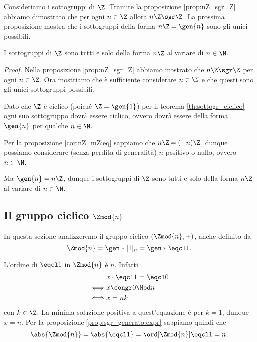 Consideriamo i sottogruppi di $\Z$. Tramite la proposizione \ref{prop:nZ_sgr_Z} abbiamo dimostrato che per ogni $n \in \Z$ allora $n\Z \sgr \Z$. La prossima proposizione mostra che i sottogruppi della forma $n\Z = \gen{n}$ sono gli unici possibili.

\begin{proposition}
    \label{prop:sgr_Z}
    I sottogruppi di $\Z$ sono tutti e solo della forma $n\Z$ al variare di $n \in \N$.
\end{proposition}
\begin{proof}
    Nella proposizione \ref{prop:nZ_sgr_Z} abbiamo mostrato che $n\Z \sgr \Z$ per ogni $n \in \Z$. Ora mostriamo che è sufficiente considerare $n \in \N$ e che questi sono gli unici sottogruppi possibili.

    Dato che $\Z$ è ciclico (poiché $\Z = \gen{1}$) per il teorema \ref{th:sottogr_ciclico} ogni suo sottogruppo dovrà essere ciclico, ovvero dovrà essere della forma $\gen{n}$ per qualche $n \in \N$.

    Per la proposizione \ref{cor:nZ_mZ:eq} sappiamo che $n\Z = (-n)\Z$, dunque possiamo considerare (senza perdita di generalità) $n$ positivo o nullo, ovvero $n \in \N$.

    Ma $\gen{n} = n\Z$, dunque i sottogruppi di $\Z$ sono tutti e solo della forma $n\Z$ al variare di $n \in \N$.
\end{proof}


\subsection{Il gruppo ciclico $\Zmod{n}$}

In questa sezione analizzeremo il gruppo ciclico $(\Zmod{n}, +)$, anche definito da \[
    \Zmod{n} = \gen*{[1]_n} = \gen*{\eqcl 1}.
\]

L'ordine di $\eqcl 1$ in $\Zmod{n}$ è $n$. Infatti \begin{align*}
    &x\cdot \eqcl 1 = \eqcl 0\\
    \iff &x \congr 0 \Mod n \\
    \iff &x = nk
\end{align*}
con $k \in \Z$. 
La minima soluzione positiva a quest'equazione è per $k = 1$, dunque $x = n$. 
Per la proposizione \ref{prop:sgr_generato:expr} sappiamo quindi che \begin{equation} \label{eq:card_Z/nZ}
    \abs{\Zmod{n}} = \abs{\eqcl 1} = \ord[\Zmod{n}]{\eqcl 1} = n.
\end{equation}

